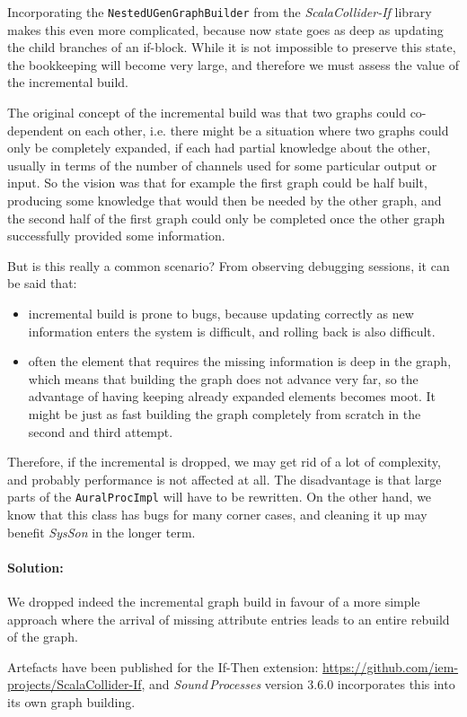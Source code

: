 \documentclass[11pt,a4paper]{article}
\newcommand{\software}[1]{\textit{#1}}
\begin{document}
Incorporating the \Verb!NestedUGenGraphBuilder! from the \software{ScalaCollider-If} library makes this even more complicated, because now state goes as deep as updating the child branches of an if-block. While it is not impossible to preserve this state, the bookkeeping will become very large, and therefore we must assess the value of the incremental build.

The original concept of the incremental build was that two graphs could co-dependent on each other, i.e. there might be a situation where two graphs could only be completely expanded, if each had partial knowledge about the other, usually in terms of the number of channels used for some particular output or input. So the vision was that for example the first graph could be half built, producing some knowledge that would then be needed by the other graph, and the second half of the first graph could only be completed once the other graph successfully provided some information.

But is this really a common scenario? From observing debugging sessions, it can be said that:
%
\begin{itemize}
\item incremental build is prone to bugs, because updating correctly as new information enters the system is difficult, and rolling back is also difficult.
\item often the element that requires the missing information is deep in the graph, which means that building the graph does not advance very far, so the advantage of having keeping already expanded elements becomes moot. It might be just as fast building the graph completely from scratch in the second and third attempt.
\end{itemize}
%
Therefore, if the incremental is dropped, we may get rid of a lot of complexity, and probably performance is not affected at all. The disadvantage is that large parts of the \Verb!AuralProcImpl! will have to be rewritten. On the other hand, we know that this class has bugs for many corner cases, and cleaning it up may benefit \software{SysSon} in the longer term.

\paragraph{Solution:} We dropped indeed the incremental graph build in favour of a more simple approach where the arrival of missing attribute entries leads to an entire rebuild of the graph.

Artefacts have been published for the If-Then extension: \url{https://github.com/iem-projects/ScalaCollider-If}, and \software{Sound\,Processes} version 3.6.0 incorporates this into its own graph building.
\end{document}
